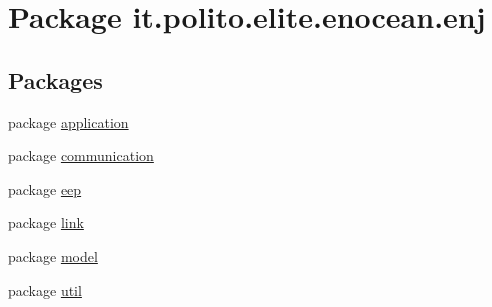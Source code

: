 \hypertarget{namespaceit_1_1polito_1_1elite_1_1enocean_1_1enj}{}\section{Package it.\+polito.\+elite.\+enocean.\+enj}
\label{namespaceit_1_1polito_1_1elite_1_1enocean_1_1enj}
\subsection*{Packages}
\begin{DoxyCompactItemize}
\item 
package \hyperlink{namespaceit_1_1polito_1_1elite_1_1enocean_1_1enj_1_1application}{application}
\item 
package \hyperlink{namespaceit_1_1polito_1_1elite_1_1enocean_1_1enj_1_1communication}{communication}
\item 
package \hyperlink{namespaceit_1_1polito_1_1elite_1_1enocean_1_1enj_1_1eep}{eep}
\item 
package \hyperlink{namespaceit_1_1polito_1_1elite_1_1enocean_1_1enj_1_1link}{link}
\item 
package \hyperlink{namespaceit_1_1polito_1_1elite_1_1enocean_1_1enj_1_1model}{model}
\item 
package \hyperlink{namespaceit_1_1polito_1_1elite_1_1enocean_1_1enj_1_1util}{util}
\end{DoxyCompactItemize}
